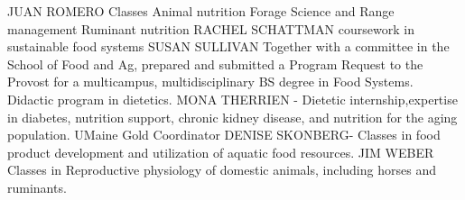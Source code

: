\documentclass[11pt]{article}
\begin{document}
\begin{description}[topsep=0pt, noitemsep]
\begin{description}[topsep=11pt, noitemsep]
JUAN ROMERO Classes Animal nutrition     Forage Science and Range management Ruminant nutrition
RACHEL SCHATTMAN coursework in sustainable food systems
SUSAN SULLIVAN Together with a committee in the School of Food and Ag, prepared and submitted a Program Request to the Provost for a multicampus, multidisciplinary BS degree in Food Systems. Didactic program in dietetics.
MONA THERRIEN - Dietetic internship,expertise in diabetes, nutrition support, chronic kidney disease, and nutrition for the aging population. UMaine Gold Coordinator
DENISE SKONBERG- Classes in food product development and utilization of aquatic food resources.
JIM WEBER Classes in Reproductive physiology of domestic animals, including horses and ruminants.


\end{description}
\end{description}
\end{document}
